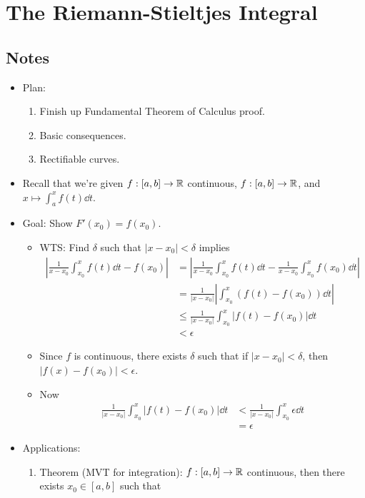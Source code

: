 \documentclass[../notes.tex]{subfiles}
\begin{document}
\chapter{The Riemann-Stieltjes Integral}
\section{Notes}
\begin{itemize}
    \item {}Plan:
    \begin{enumerate}
        \item Finish up Fundamental Theorem of Calculus proof.
        \item Basic consequences.
        \item Rectifiable curves.
    \end{enumerate}
    \item Recall that we're given $f:[a,b]\to\mathbb{R}$ continuous, $f:[a,b]\to\mathbb{R}$, and $x\mapsto\int_a^xf(t)\dd{t}$.
    \item Goal: Show $F'(x_0)=f(x_0)$.
    \begin{itemize}
        \item WTS: Find $\delta$ such that $|x-x_0|<\delta$ implies
        \begin{align*}
            \left| \frac{1}{x-x_0}\int_{x_0}^xf(t)\dd{t}-f(x_0) \right| &= \left| \frac{1}{x-x_0} \int_{x_0}^xf(t)\dd{t}-\frac{1}{x-x_0}\int_{x_0}^xf(x_0)\dd{t} \right|\\
            &= \frac{1}{|x-x_0|}\left| \int_{x_0}^x(f(t)-f(x_0))\dd{t} \right|\\
            &\leq \frac{1}{|x-x_0|}\int_{x_0}^x|f(t)-f(x_0)|\dd{t}\\
            &< \epsilon
        \end{align*}
        \item Since $f$ is continuous, there exists $\delta$ such that if $|x-x_0|<\delta$, then $|f(x)-f(x_0)|<\epsilon$.
        \item Now
        \begin{align*}
            \frac{1}{|x-x_0|}\int_{x_0}^x|f(t)-f(x_0)|\dd{t} &< \frac{1}{|x-x_0|}\int_{x_0}^x\epsilon\dd{t}\\
            &= \epsilon
        \end{align*}
    \end{itemize}
    \item Applications:
    \begin{enumerate}
        \item Theorem (MVT for integration): $f:[a,b]\to\mathbb{R}$ continuous, then there exists $x_0\in[a,b]$ such that

\end{enumerate}
\end{itemize}
\end{document}
